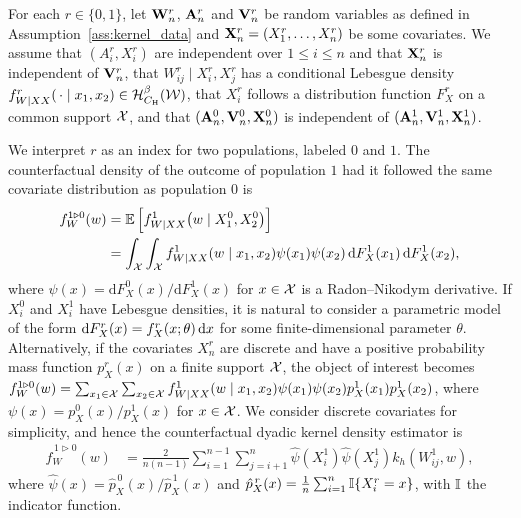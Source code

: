 For each $r \in \{0,1\}$,
let $\mathbf{W}_n^r$, $\mathbf{A}_n^r$ and $\mathbf{V}_n^r$ be random variables
as defined in Assumption~\ref{ass:kernel_data} and
$\mathbf{X}_n^r = (X_1^r, \ldots, X_n^r)$ be some covariates.
We assume that $(A_i^r, X_i^r)$ are
independent over $1 \leq i \leq n$
and that $\mathbf{X}_n^r$ is independent of $\mathbf{V}_n^r$,
that $W_{i j}^r \mid X_i^r, X_j^r$
has a conditional Lebesgue density
$f_{W \mid XX}^r(\,\cdot \mid x_1, x_2) \in \mathcal{H}^\beta_{C_{\mathrm{H}}}(\mathcal{W})$,
that $X_i^r$ follows a distribution function $F_X^r$
on a common support $\mathcal{X}$, and that
$(\mathbf{A}_n^0, \mathbf{V}_n^0, \mathbf{X}_n^0)$
is independent of $(\mathbf{A}_n^1, \mathbf{V}_n^1, \mathbf{X}_n^1)$.

We interpret $r$ as an index for two populations,
labeled $0$ and $1$.
The counterfactual density of the outcome of
population $1$ had it followed the same covariate distribution
as population $0$ is
%
\begin{align*}
  f_W^{1 \triangleright 0}(w)
  &=
  \mathbb{E}\left[
    f_{W \mid XX}^1\big(w \mid X_1^0, X_2^0\big)
  \right] \\
  &=
  \int_{\mathcal{X}}
  \int_{\mathcal{X}}
  f_{W \mid XX}^{1}(w \mid x_1, x_2)
  \psi(x_1)
  \psi(x_2)
  \,\mathrm{d}F_X^{1}(x_1)
  \,\mathrm{d}F_X^{1}(x_2),
\end{align*}
%
where $\psi(x) = \mathrm{d} F_X^0(x) / \mathrm{d} F_X^1(x)$ for $x \in \mathcal{X}$
is a Radon--Nikodym derivative.
If $X^0_i$ and $X^1_i$ have Lebesgue densities,
it is natural to consider a parametric model of the form
$\mathrm{d} F_X^{r}(x)=f_X^r(x;\theta)\,\mathrm{d}x$
for some finite-dimensional parameter $\theta$.
Alternatively, if the covariates $X_n^r$ are discrete and have a positive
probability mass function $p_X^r(x)$ on a finite
support $\mathcal{X}$, the object of interest becomes
$f_W^{1 \triangleright 0}(w)
= \sum_{x_1 \in \mathcal{X}} \sum_{x_2 \in \mathcal{X}}
f_{W \mid XX}^{1}(w \mid x_1, x_2) \psi(x_1) \psi(x_2)
p_X^{1}(x_1) p_X^{1}(x_2)$,
where $\psi(x) = p_X^0(x)/p_X^1(x)$ for $x \in \mathcal{X}$.
We consider discrete covariates for simplicity,
and hence the counterfactual dyadic kernel density estimator is
%
\begin{align*}
  \hat f_W^{\,1 \triangleright 0}(w)
  &=
  \frac{2}{n(n-1)}
  \sum_{i=1}^{n-1}
  \sum_{j=i+1}^n
  \hat \psi(X_i^1)
  \hat \psi(X_j^1)
  k_h(W_{i j}^1, w),
\end{align*}
%
where $\hat\psi(x) = \hat p_X^{\,0}(x) / \hat p_X^{\,1}(x)$ and
$\hat p_X^{\,r}(x) = \frac{1}{n}\sum_{i = 1}^n \mathbb{I}\{X_i^r = x\}$,
with $\mathbb{I}$ the indicator function.

